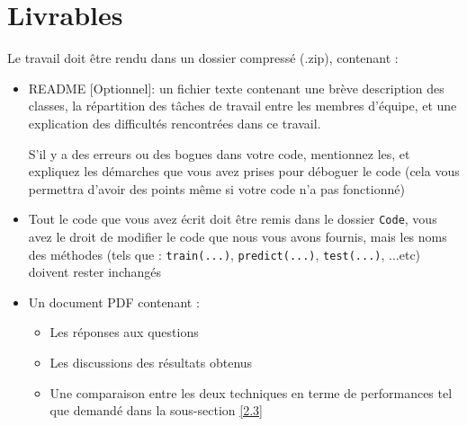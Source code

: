\documentclass[latter,12pt]{article}
\begin{document}
\section{Livrables}
Le travail doit être rendu dans un dossier compressé (.zip), contenant :
\begin{itemize}
\item README [Optionnel]: un fichier texte contenant une brève description des classes, la répartition des tâches de travail entre les membres d'équipe, et une explication des difficultés rencontrées dans ce travail.

S'il y a des erreurs ou des bogues dans votre code, mentionnez les, et expliquez les démarches que vous avez prises pour déboguer le code (cela vous permettra d'avoir des points même si votre code n'a pas fonctionné)

\item Tout le code que vous avez écrit doit être remis dans le dossier \verb!Code!, vous avez le droit de modifier le code que nous vous avons fournis, mais les noms des méthodes (tels que : \verb!train(...)!, \verb!predict(...)!, \verb!test(...)!, ...etc) doivent rester inchangés

\item Un document PDF contenant : 
	\begin{itemize}
	\item Les réponses aux questions
	\item Les discussions des résultats obtenus
	\item Une comparaison entre les deux techniques en terme de performances tel que demandé dans la sous-section \ref{2.3}
	\end{itemize}
\end{itemize}
\end{document}
